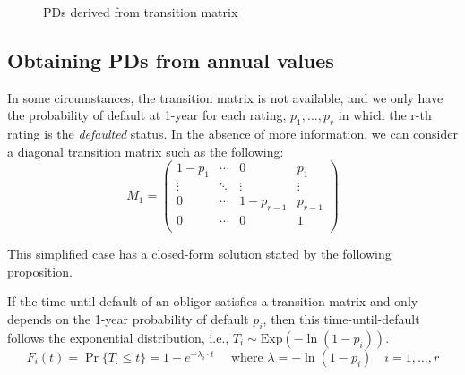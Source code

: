 \documentclass[11pt,fleqn]{book} %
\begin{document}
\begin{figure}[!ht]
	\centering
	\caption{PDs derived from transition matrix}
	\label{fig:pdftm}
\end{figure}

\subsection{Obtaining PDs from annual values}
\label{pdfsv}

In some circumstances, the transition matrix is not available, and we only 
have the probability of default at 1-year for each rating, 
$p_1,\dots,p_r$ in which the r-th rating is the \emph{defaulted} 
status. In the absence of more information, we can consider a diagonal 
transition matrix such as the following:
\begin{displaymath}
	M_1 = \left(
	\begin{array}{cccc}
		1-p_1  & \cdots & 0         & p_1     \\
		\vdots & \ddots & \vdots    & \vdots  \\
		0      & \cdots & 1-p_{r-1} & p_{r-1} \\
		0      & \cdots & 0         & 1       \\
	\end{array}
	\right)
\end{displaymath}

This simplified case has a closed-form solution stated by the following 
proposition.

\begin{proposition}
	\label{prop:pdfsv}
	If the time-until-default of an obligor satisfies a transition matrix 
	and only depends on the 1-year probability of default $p_i$, then this
	time-until-default follows the exponential distribution, i.e.,
	$T_i \sim \text{Exp}(-\ln(1-p_i))$.
	\begin{displaymath}
		F_i(t) = \Pr\{T_. \le t\} = 1 - e^{-\lambda_i \cdot t} 
		\quad \text{ where } \lambda = -\ln(1-p_i)
		\quad i=1,\dots,r
	\end{displaymath}
\end{proposition}
\end{document}
